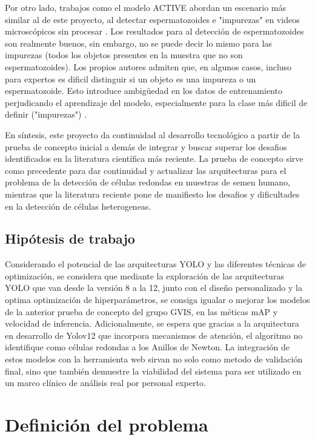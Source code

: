 \documentclass[12pt,a4paper,onecolumn,oneside]{report}
\begin{document}
Por otro lado, trabajos como el modelo ACTIVE abordan un escenario más similar al de este proyecto, al detectar espermatozoides e "impurezas" en videos microscópicos sin procesar \cite{chen2024}. Los resultados para al detección de espermatozoides son realmente buenos, sin embargo, no se puede decir lo mismo
para las impurezas (todos los objetos presentes en la muestra que no son espermatozoides). Los propios autores admiten que, en algunos casos, incluso para expertos es dificil distinguir si un objeto
es una impureza o un espermatozoide. Esto introduce ambigüedad en los datos de entrenamiento perjudicando el aprendizaje del modelo, especialmente para la clase más dificil de definir ("impurezas") \cite{chen2024}.

En síntesis, este proyecto da continuidad al desarrollo tecnológico a partir de la prueba de concepto inicial a demás de integrar y buscar superar los desafios identificados en la literatura científica más reciente. La prueba de concepto sirve como precedente para dar continuidad y actualizar las 
arquitecturas para el problema de la detección de células redondas en muestras de semen humano, mientras que la literatura reciente pone de manifiesto los desafios y dificultades en la detección de células heterogeneas. 


\subsection{Hipótesis de trabajo}

Considerando el potencial de las arquitecturas YOLO y las diferentes técnicas de optimización, se considera que mediante la exploración de las arquitecturas YOLO que van desde la versión 8 a la 12, 
junto con el diseño personalizado y la optima optimización de hiperparámetros, se consiga igualar o mejorar los modelos de la anterior prueba de concepto del grupo GVIS, 
en las méticas mAP y velocidad de inferencia. Adicionalmente, se espera que gracias a la arquitectura en desarrollo de Yolov12 que incorpora mecanismos de atención, el algoritmo no identifique 
como células redondas a los Anillos de Newton. La integración de estos modelos con la herramienta web sirvan no solo como metodo de validación final, sino que también demuestre la viabilidad del sistema 
para ser utilizado en un marco clínico de análisis real por personal experto.

\section{Definición del problema}
\label{sec:Definición del problema}
\end{document}

